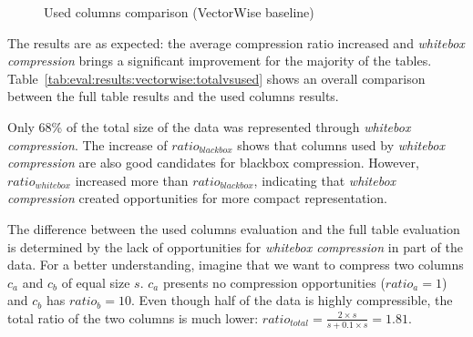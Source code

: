 \begin{figure}[h]
  \centering
  \caption{Used columns comparison (VectorWise baseline)}
  \label{fig:eval:results:vectorwise:used}
\end{figure}

The results are as expected: the average compression ratio increased and \textit{whitebox compression} brings a significant improvement for the majority of the tables. Table~\ref{tab:eval:results:vectorwise:totalvsused} shows an overall comparison between the full table results and the used columns results.



Only 68\% of the total size of the data was represented through \textit{whitebox compression}. The increase of \(ratio_{blackbox}\) shows that columns used by \textit{whitebox compression} are also good candidates for  blackbox compression. However, \(ratio_{whitebox}\) increased more than \(ratio_{blackbox}\), indicating that \textit{whitebox compression} created opportunities for more compact representation.

The difference between the used columns evaluation and the full table evaluation is determined by the lack of opportunities for \textit{whitebox compression} in part of the data. For a better understanding, imagine that we want to compress two columns \(c_{a}\) and \(c_{b}\) of equal size \(s\). \(c_{a}\) presents no compression opportunities (\(ratio_{a} = 1\)) and \(c_{b}\) has \(ratio_{b} = 10\). Even though half of the data is highly compressible, the total ratio of the two columns is much lower: \(ratio_{total} = \frac{2 \times s}{s + 0.1 \times s} = 1.81\).

